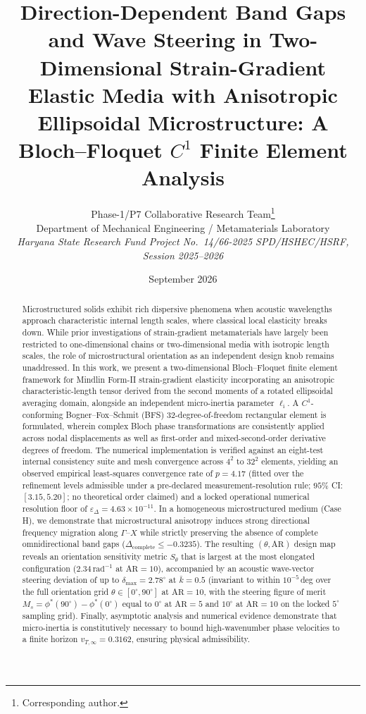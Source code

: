 \documentclass[11pt,a4paper]{article}
\title{\textbf{Direction-Dependent Band Gaps and Wave Steering in Two-Dimensional Strain-Gradient Elastic Media with Anisotropic Ellipsoidal Microstructure: A Bloch--Floquet $C^1$ Finite Element Analysis}}
\author{
  Phase-1/P7 Collaborative Research Team\thanks{Corresponding author.}\\
  \small Department of Mechanical Engineering / Metamaterials Laboratory\\
  \small \textit{Haryana State Research Fund Project No.\ 14/66-2025 SPD/HSHEC/HSRF, Session 2025--2026}
}
\date{September 2026}
\begin{document}
\maketitle

\begin{abstract}
Microstructured solids exhibit rich dispersive phenomena when acoustic wavelengths approach characteristic internal length scales, where classical local elasticity breaks down. While prior investigations of strain-gradient metamaterials have largely been restricted to one-dimensional chains or two-dimensional media with isotropic length scales, the role of microstructural orientation as an independent design knob remains unaddressed. In this work, we present a two-dimensional Bloch--Floquet finite element framework for Mindlin Form-II strain-gradient elasticity incorporating an anisotropic characteristic-length tensor derived from the second moments of a rotated ellipsoidal averaging domain, alongside an independent micro-inertia parameter $\ell_{\mathrm{i}}$. A $C^1$-conforming Bogner--Fox--Schmit (BFS) 32-degree-of-freedom rectangular element is formulated, wherein complex Bloch phase transformations are consistently applied across nodal displacements as well as first-order and mixed-second-order derivative degrees of freedom. The numerical implementation is verified against an eight-test internal consistency suite and mesh convergence across $4^2$ to $32^2$ elements, yielding an observed empirical least-squares convergence rate of $p = 4.17$ (fitted over the refinement levels admissible under a pre-declared measurement-resolution rule; $95\%$ CI: $[3.15, 5.20]$; no theoretical order claimed) and a locked operational numerical resolution floor of $\varepsilon_\Delta = 4.63 \times 10^{-11}$. In a homogeneous microstructured medium (Case H), we demonstrate that microstructural anisotropy induces strong directional frequency migration along $\Gamma$--$X$ while strictly preserving the absence of complete omnidirectional band gaps ($\Delta_{\mathrm{complete}} \le -0.3235$). The resulting $(\theta, \mathrm{AR})$ design map reveals an orientation sensitivity metric $S_\theta$ that is largest at the most elongated configuration ($2.34\,\mathrm{rad}^{-1}$ at $\mathrm{AR} = 10$), accompanied by an acoustic wave-vector steering deviation of up to $\delta_{\max} = 2.78^\circ$ at $\bar{k} = 0.5$ (invariant to within $10^{-5}\,$deg over the full orientation grid $\theta \in [0^\circ, 90^\circ]$ at $\mathrm{AR}=10$, with the steering figure of merit $M_s = \phi^*(90^\circ) - \phi^*(0^\circ)$ equal to $0^\circ$ at $\mathrm{AR}=5$ and $10^\circ$ at $\mathrm{AR}=10$ on the locked $5^\circ$ sampling grid). Finally, asymptotic analysis and numerical evidence demonstrate that micro-inertia is constitutively necessary to bound high-wavenumber phase velocities to a finite horizon $v_{T,\infty} = 0.3162$, ensuring physical admissibility.
\end{abstract}
\end{document}
